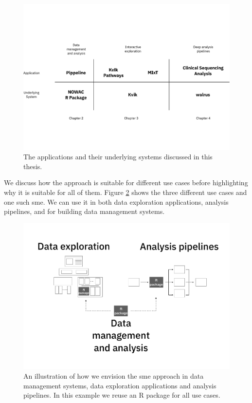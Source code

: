 \begin{figure}
\includegraphics[width=\textwidth]{figures/all-systems.pdf}
    \caption{The applications and their underlying systems discussed in this
    thesis.} 
    \label{overview-fig}
\end{figure} 


We discuss how the approach is suitable for different use cases before
highlighting why it is suitable for all of them. Figure \ref{overview-full}
shows the three different use cases and one such \gls{sme}. We can use it in
both data exploration applications, analysis pipelines, and for building data
management systems.

\begin{figure}
\includegraphics[width=\textwidth]{figures/overview-full.pdf}
    \caption{An illustration of how we envision the \gls{sme} approach in data
    management systems, data exploration applications and analysis pipelines. In
    this example we reuse an R package for all use cases.}
    \label{overview-full}
\end{figure} 

